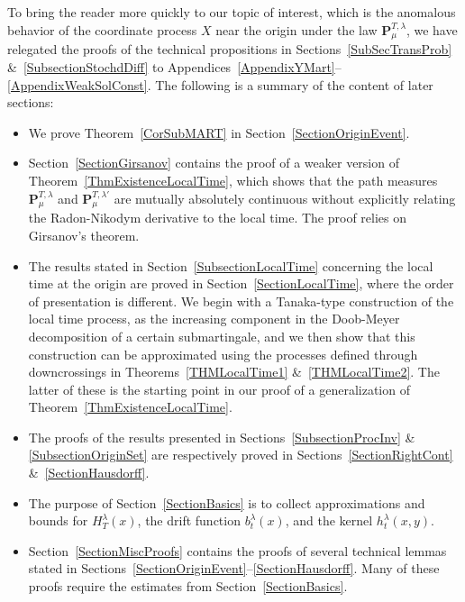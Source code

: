 \documentclass[10pt]{article}
\numberwithin{equation}{section}
\theoremstyle{definition}
\begin{document}
To bring the reader more quickly to our topic of interest, which is the anomalous behavior of the coordinate process $X$ near the origin under the law $\mathbf{P}^{T,\lambda}_{\mu}$, we have relegated the proofs of the  technical propositions in Sections~\ref{SubSecTransProb} \&~\ref{SubsectionStochdDiff} to  Appendices~\ref{AppendixYMart}--\ref{AppendixWeakSolConst}.  The following is  a summary of the content of later sections:
\begin{itemize}
    \item We prove Theorem~\ref{CorSubMART} in Section~\ref{SectionOriginEvent}.

    \item  Section~\ref{SectionGirsanov} contains the proof of a weaker version of Theorem~\ref{ThmExistenceLocalTime}, which shows that the path measures $\mathbf{P}^{T,\lambda}_{\mu}$ and $\mathbf{P}^{T,\lambda'}_{\mu}$ are mutually absolutely continuous without explicitly relating the Radon-Nikodym derivative to the local time. The proof relies on Girsanov's theorem.
    

    \item  The  results stated in  Section~\ref{SubsectionLocalTime} concerning the local time at the origin are proved in  Section~\ref{SectionLocalTime}, where the order of  presentation is  different.  We begin with a Tanaka-type construction of the local time process, as the increasing component in the Doob-Meyer decomposition of a certain submartingale, and we then show that this construction can be approximated using the processes defined through  downcrossings  in Theorems~\ref{THMLocalTime1} \&~\ref{THMLocalTime2}. The latter of these is the starting point in our proof of a generalization of Theorem~\ref{ThmExistenceLocalTime}.
    

    \item  The proofs of the results presented in  Sections~\ref{SubsectionProcInv} \& \ref{SubsectionOriginSet} are respectively proved in Sections~\ref{SectionRightCont} \&~\ref{SectionHausdorff}.



    
    \item The purpose of Section~\ref{SectionBasics} is to collect approximations and bounds for  $H_{T}^{\lambda}(x)$, the drift function $b_t^{\lambda}(x)$, and the kernel $h_t^{\lambda}(x,y)$.   


    \item  Section~\ref{SectionMiscProofs} contains the proofs of several technical lemmas stated in Sections~\ref{SectionOriginEvent}--\ref{SectionHausdorff}.  Many of these proofs  require the estimates from Section~\ref{SectionBasics}.  

\end{itemize}
\end{document}
